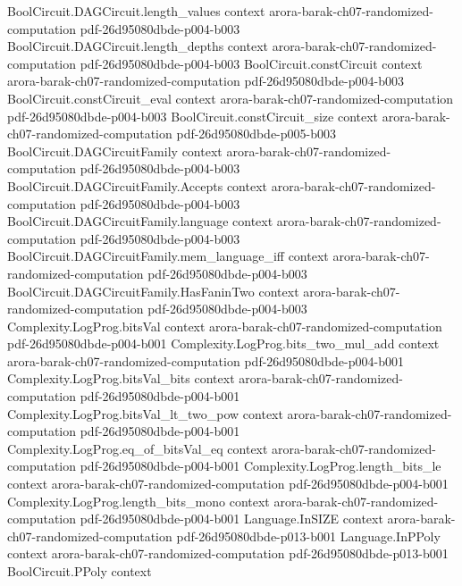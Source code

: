 \begin{theorem}
\proofstep
  {BoolCircuit.DAGCircuit.length_values}
  {context}
  {arora-barak-ch07-randomized-computation}
  {pdf-26d95080dbde-p004-b003}
\proofstep
  {BoolCircuit.DAGCircuit.length_depths}
  {context}
  {arora-barak-ch07-randomized-computation}
  {pdf-26d95080dbde-p004-b003}
\proofstep
  {BoolCircuit.constCircuit}
  {context}
  {arora-barak-ch07-randomized-computation}
  {pdf-26d95080dbde-p004-b003}
\proofstep
  {BoolCircuit.constCircuit_eval}
  {context}
  {arora-barak-ch07-randomized-computation}
  {pdf-26d95080dbde-p004-b003}
\proofstep
  {BoolCircuit.constCircuit_size}
  {context}
  {arora-barak-ch07-randomized-computation}
  {pdf-26d95080dbde-p005-b003}
\proofstep
  {BoolCircuit.DAGCircuitFamily}
  {context}
  {arora-barak-ch07-randomized-computation}
  {pdf-26d95080dbde-p004-b003}
\proofstep
  {BoolCircuit.DAGCircuitFamily.Accepts}
  {context}
  {arora-barak-ch07-randomized-computation}
  {pdf-26d95080dbde-p004-b003}
\proofstep
  {BoolCircuit.DAGCircuitFamily.language}
  {context}
  {arora-barak-ch07-randomized-computation}
  {pdf-26d95080dbde-p004-b003}
\proofstep
  {BoolCircuit.DAGCircuitFamily.mem_language_iff}
  {context}
  {arora-barak-ch07-randomized-computation}
  {pdf-26d95080dbde-p004-b003}
\proofstep
  {BoolCircuit.DAGCircuitFamily.HasFaninTwo}
  {context}
  {arora-barak-ch07-randomized-computation}
  {pdf-26d95080dbde-p004-b003}
\proofstep
  {Complexity.LogProg.bitsVal}
  {context}
  {arora-barak-ch07-randomized-computation}
  {pdf-26d95080dbde-p004-b001}
\proofstep
  {Complexity.LogProg.bits_two_mul_add}
  {context}
  {arora-barak-ch07-randomized-computation}
  {pdf-26d95080dbde-p004-b001}
\proofstep
  {Complexity.LogProg.bitsVal_bits}
  {context}
  {arora-barak-ch07-randomized-computation}
  {pdf-26d95080dbde-p004-b001}
\proofstep
  {Complexity.LogProg.bitsVal_lt_two_pow}
  {context}
  {arora-barak-ch07-randomized-computation}
  {pdf-26d95080dbde-p004-b001}
\proofstep
  {Complexity.LogProg.eq_of_bitsVal_eq}
  {context}
  {arora-barak-ch07-randomized-computation}
  {pdf-26d95080dbde-p004-b001}
\proofstep
  {Complexity.LogProg.length_bits_le}
  {context}
  {arora-barak-ch07-randomized-computation}
  {pdf-26d95080dbde-p004-b001}
\proofstep
  {Complexity.LogProg.length_bits_mono}
  {context}
  {arora-barak-ch07-randomized-computation}
  {pdf-26d95080dbde-p004-b001}
\proofstep
  {Language.InSIZE}
  {context}
  {arora-barak-ch07-randomized-computation}
  {pdf-26d95080dbde-p013-b001}
\proofstep
  {Language.InPPoly}
  {context}
  {arora-barak-ch07-randomized-computation}
  {pdf-26d95080dbde-p013-b001}
\proofstep
  {BoolCircuit.PPoly}
  {context}

\end{theorem}
